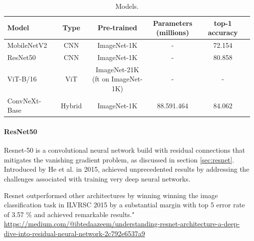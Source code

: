\begin{table}[ht]
    \centering
    \caption{Models. }
    \scriptsize
    \begin{tabular}{lcccc}
    \toprule
    \textbf{Model} & \textbf{Type} & \textbf{Pre-trained} & \makecell{\textbf{Parameters} \\ \textbf{(millions)}} & \textbf{top-1 accuracy} \\
    \midrule
    MobileNetV2 \cite{sandler2018mobilenetv2} & CNN  & ImageNet-1K & - & 72.154 \cite{pytorch_mobilenetv2} \\
    ResNet50 \cite{he2015deepresiduallearningimage} & CNN & ImageNet-1K & - & 	
    80.858 \cite{torchvision-resnet} \\
    ViT-B/16 \cite{dosovitskiy2021imageworth16x16words}   & ViT & \makecell{ImageNet-21K \\ (ft on ImageNet-1K)} & - & 	- \\
    ConvNeXt-Base \cite{todi2023convnext}  & Hybrid & ImageNet-1K & 88.591.464 & 84.062 \cite{torchvision-convnext} \\
    \bottomrule
    \end{tabular}
    \label{tab:model_performance}
\end{table}



\paragraph{ResNet50}
Resnet-50 \cite{he2015deepresiduallearningimage} is a convolutional neural network build with residual connections that mitigates the vanishing gradient problem, as discussed in section \ref{sec:resnet}. Introduced by He et al. in 2015, achieved unprecedented results by addressing the challenges associated with training very deep neural networks. 

Resnet outperformed other architectures by winning winning the image classification task in ILVRSC 2015 by a substantial margin with top 5 error rate of 3.57 \% and achieved remarkable results." \url{https://medium.com/@ibtedaazeem/understanding-resnet-architecture-a-deep-dive-into-residual-neural-network-2c792e6537a9}



    

